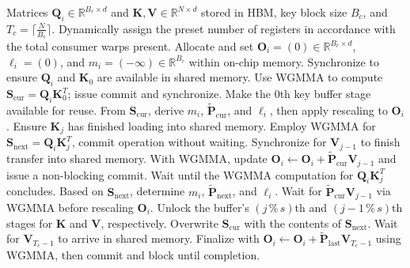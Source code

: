 \begin{algorithm}[H]
    \caption{\small\label{alg:flash3_wgmma}\textsc{FlashAttention-3} Consumer Warpgroup Forward Pass}
    \begin{algorithmic}[1]
      \REQUIRE Matrices $\mathbf{Q}_i \in \mathbb{R}^{B_r \times d}$ and $\mathbf{K}, \mathbf{V} \in \mathbb{R}^{N \times d}$ stored in HBM, key block size $B_c$, and $T_c = \lceil \frac{N}{B_c} \rceil$.
      \STATE Dynamically assign the preset number of registers in accordance with the total consumer warps present.
      \STATE Allocate and set $\mathbf{O}_i = (0) \in \mathbb{R}^{B_r \times d}$, $\ell_i = (0)$, and $m_i = (-\infty) \in \mathbb{R}^{B_r}$ within on-chip memory.
      \STATE Synchronize to ensure $\mathbf{Q}_i$ and $\mathbf{K}_0$ are available in shared memory.
      \STATE Use WGMMA to compute $\mathbf{S}_{\mathrm{cur}} = \mathbf{Q}_i \mathbf{K}_0^T$; issue commit and synchronize.
      \STATE Make the $0$th key buffer stage available for reuse.
      \STATE From $\mathbf{S}_{\mathrm{cur}}$, derive $m_{i}$, $\tilde{\mathbf{P}}_{\mathrm{cur}}$, and $\ell_{i}$, then apply rescaling to $\mathbf{O}_i$.
        \STATE Ensure $\mathbf{K}_j$ has finished loading into shared memory.
        \label{code:mainloop_start}
        \STATE Employ WGMMA for $\mathbf{S}_{\mathrm{next}} = \mathbf{Q}_i \mathbf{K}_{j}^T$, commit operation without waiting. \label{code:first_wgmma}
        \STATE Synchronize for $\mathbf{V}_{j-1}$ to finish transfer into shared memory.
        \STATE With WGMMA, update $\mathbf{O}_{i} \leftarrow \mathbf{O}_{i} + \tilde{\mathbf{P}}_{\mathrm{cur}} \mathbf{V}_{j-1}$ and issue a non-blocking commit. \label{code:second_wgmma}
        \STATE Wait until the WGMMA computation for $\mathbf{Q}_i \mathbf{K}_{j}^T$ concludes.
        \STATE Based on $\mathbf{S}_{\mathrm{next}}$, determine $m_{i}$, $\tilde{\mathbf{P}}_{\mathrm{next}}$, and $\ell_{i}$. \label{code:softmax}
        \STATE Wait for $\tilde{\mathbf{P}}_{\mathrm{cur}} \mathbf{V}_{j-1}$ via WGMMA before rescaling $\mathbf{O}_i$.
        \STATE Unlock the buffer’s $(j\,\%\,s)$th and $(j-1\,\%\,s)$th stages for $\mathbf{K}$ and $\mathbf{V}$, respectively.
        \STATE Overwrite $\mathbf{S}_{\mathrm{cur}}$ with the contents of $\mathbf{S}_{\mathrm{next}}$.
        \label{code:mainloop_end}
      \ENDFOR \STATE Wait for $\mathbf{V}_{T_c - 1}$ to arrive in shared memory.
      \STATE Finalize with $\mathbf{O}_{i} \leftarrow \mathbf{O}_{i} + \tilde{\mathbf{P}}_{\mathrm{last}} \mathbf{V}_{T_c - 1}$ using WGMMA, then commit and block until completion.


\end{algorithmic}
\end{algorithm}
